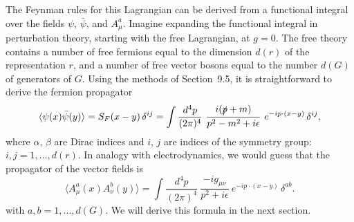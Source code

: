 The Feynman rules for this Lagrangian can be derived from a functional
integral over the fields $\psi$, $\bar{\psi}$, and $A^a_\mu$.  Imagine
expanding the functional integral in perturbation theory, starting with the
free Lagrangian, at $g = 0$.  The free theory contains a number of free
fermions equal to the dimension $d(r)$ of the representation $r$, and a
number of free vector bosons equal to the number $d(G)$ of generators of
$G$.  Using the methods of Section~9.5, it is straightforward to derive the
fermion propagator
\begin{equation}
  \langle\psi(x)\bar{\psi}(y)\rangle = S_F(x-y)\,\delta^{ij}
  = \int \frac{d^4p}{(2\pi)^4}\ \frac{i(\slashed{p}+m)}{p^2-m^2+i\epsilon}\
    e^{-ip\cdot(x-y)}\,\delta^{ij} ,
  \label{eq:16.4}
\end{equation}
where $\alpha$, $\beta$ are Dirac indices and $i$, $j$ are indices of the
symmetry group: $i, j = 1, \ldots, d(r)$.  In analogy with electrodynamics,
we would guess that the propagator of the vector fields is
\begin{equation}
  \langle A^a_\mu(x)A^b_\nu(y)\rangle
  = \int \frac{d^4p}{(2\pi)^4}\ \frac{-ig_{\mu\nu}}{p^2+i\epsilon}\
    e^{-ip\cdot(x-y)}\,\delta^{ab} .
  \label{eq:16.5}
\end{equation}
with $a, b = 1, \ldots, d(G)$.  We will derive this formula in the next
section.


